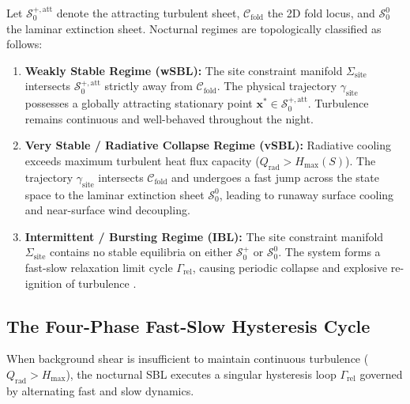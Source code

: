 \begin{definition}
Let $\mathcal{S}_0^{+,\mathrm{att}}$ denote the attracting turbulent sheet, $\mathcal{C}_{\mathrm{fold}}$ the 2D fold locus, and $\mathcal{S}_0^0$ the laminar extinction sheet. Nocturnal regimes are topologically classified as follows:
\begin{enumerate}
    \item \textbf{Weakly Stable Regime (wSBL):} The site constraint manifold $\Sigma_{\mathrm{site}}$ intersects $\mathcal{S}_0^{+,\mathrm{att}}$ strictly away from $\mathcal{C}_{\mathrm{fold}}$. The physical trajectory $\gamma_{\mathrm{site}}$ possesses a globally attracting stationary point $\mathbf{x}^* \in \mathcal{S}_0^{+,\mathrm{att}}$. Turbulence remains continuous and well-behaved throughout the night.

    \item \textbf{Very Stable / Radiative Collapse Regime (vSBL):} Radiative cooling exceeds maximum turbulent heat flux capacity ($Q_{\mathrm{rad}} > H_{\max}(S)$). The trajectory $\gamma_{\mathrm{site}}$ intersects $\mathcal{C}_{\mathrm{fold}}$ and undergoes a fast jump across the state space to the laminar extinction sheet $\mathcal{S}_0^0$, leading to runaway surface cooling and near-surface wind decoupling.

    \item \textbf{Intermittent / Bursting Regime (IBL):} The site constraint manifold $\Sigma_{\mathrm{site}}$ contains no stable equilibria on either $\mathcal{S}_0^+$ or $\mathcal{S}_0^0$. The system forms a fast-slow relaxation limit cycle $\Gamma_{\mathrm{rel}}$, causing periodic collapse and explosive re-ignition of turbulence \citep{Acevedo2006, VanHooijdonk2015}.
\end{enumerate}
\end{definition}

\subsection{The Four-Phase Fast-Slow Hysteresis Cycle}

When background shear is insufficient to maintain continuous turbulence ($Q_{\mathrm{rad}} > H_{\max}$), the nocturnal SBL executes a singular hysteresis loop $\Gamma_{\mathrm{rel}}$ governed by alternating fast and slow dynamics.

